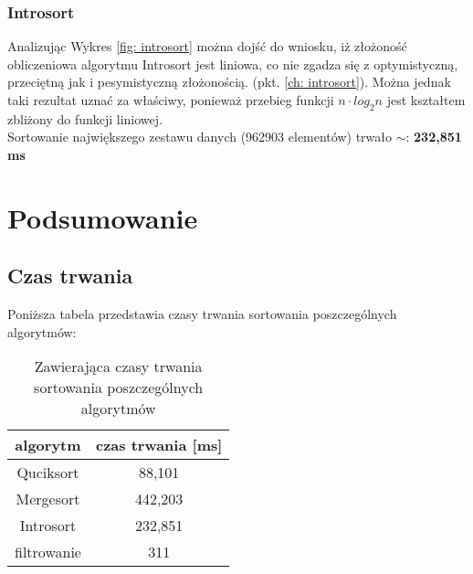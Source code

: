 \documentclass[12pt]{article}
\begin{document}
\subsubsection{Introsort}
Analizując Wykres \ref{fig: introsort} można dojść do wniosku, iż złożoność obliczeniowa algorytmu Introsort jest
liniowa, co nie zgadza się z optymistyczną, przeciętną jak i pesymistyczną złożonością. (pkt. \ref{ch: introsort}). Można 
jednak taki rezultat uznać za właściwy, ponieważ przebieg funkcji $n \cdot log_2 n$ jest kształtem zbliżony do funkcji 
liniowej.\\

Sortowanie największego zestawu danych (962903 elementów) trwało $\sim$: \textbf{232,851 ms}

\section{Podsumowanie}
\subsection{Czas trwania}
Poniższa tabela przedstawia czasy trwania sortowania poszczególnych algorytmów:

\begin{table}[H]
       \centering
       \caption{Zawierająca czasy trwania sortowania poszczególnych algorytmów}
       \begin{tabular}{|c|c|}
       \hline
       algorytm  & czas trwania {[}ms{]} \\ \hline
       Quciksort & 88,101               \\ \hline
       Mergesort & 442,203               \\ \hline
       Introsort & 232,851               \\ \hline
       filtrowanie &    311             \\ \hline
       \end{tabular}
       \label{tab: czasy}
       \end{table}
\end{document}
